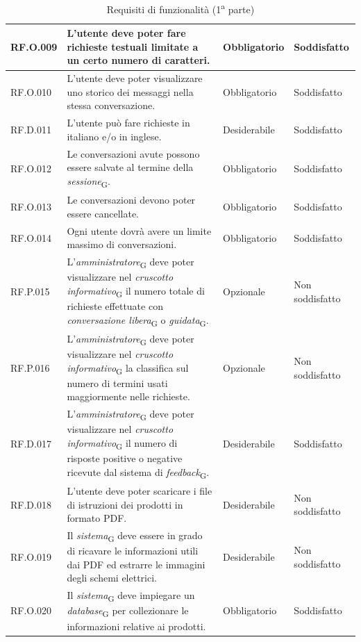 \begin{table}[H]
\centering
    \begin{tabular}{|C{2.7cm}|L{6.5cm}|C{2.7cm}|C{2.7cm}|}
        \hline
        RF.O.009 & L’utente deve poter fare richieste testuali limitate a un certo numero di caratteri. & Obbligatorio & Soddisfatto \\
        \hline
        RF.O.010 & L’utente deve poter visualizzare uno storico dei messaggi nella stessa
        conversazione. & Obbligatorio & Soddisfatto \\
        \hline
        RF.D.011 & L’utente può fare richieste in italiano e/o in inglese.
         & Desiderabile & Soddisfatto \\
         \hline
         RF.O.012 & Le conversazioni avute possono essere salvate al termine della \textit{sessione}\textsubscript{G}. & Obbligatorio & Soddisfatto \\
        \hline
        RF.O.013 & Le conversazioni devono poter essere cancellate. & Obbligatorio & Soddisfatto \\
        \hline
        RF.O.014 & Ogni utente dovrà avere un limite massimo di conversazioni.
         & Obbligatorio & Soddisfatto \\
        \hline
        RF.P.015 & L'\textit{amministratore}\textsubscript{G} deve poter visualizzare nel \textit{cruscotto informativo}\textsubscript{G} il numero totale di richieste effettuate con \textit{conversazione libera}\textsubscript{G} o \textit{guidata}\textsubscript{G}.
         & Opzionale & Non soddisfatto \\
        \hline
        RF.P.016 & L'\textit{amministratore}\textsubscript{G} deve poter visualizzare nel \textit{cruscotto informativo}\textsubscript{G} la classifica sul numero di termini usati maggiormente nelle richieste.
         & Opzionale & Non soddisfatto \\
        \hline
        RF.D.017 & L'\textit{amministratore}\textsubscript{G} deve poter visualizzare nel \textit{cruscotto informativo}\textsubscript{G} il numero di risposte positive o negative ricevute dal sistema di \textit{feedback}\textsubscript{G}.
         & Desiderabile & Soddisfatto \\
        \hline
         RF.D.018 & L'utente deve poter scaricare i file di istruzioni dei prodotti in formato PDF.
         & Desiderabile & Non soddisfatto \\
        \hline
        
         RF.O.019 & Il \textit{sistema}\textsubscript{G} deve essere in grado di ricavare le informazioni utili dai PDF ed estrarre le immagini degli schemi elettrici.
         & Desiderabile & Non soddisfatto \\
        \hline
         RF.O.020 & Il \textit{sistema}\textsubscript{G} deve impiegare un \textit{database}\textsubscript{G} per collezionare le informazioni relative ai prodotti.
         & Obbligatorio & Soddisfatto \\
        \hline
        \end{tabular}
    \caption{Requisiti di funzionalità (1\textsuperscript{a}  parte)}
\end{table}
